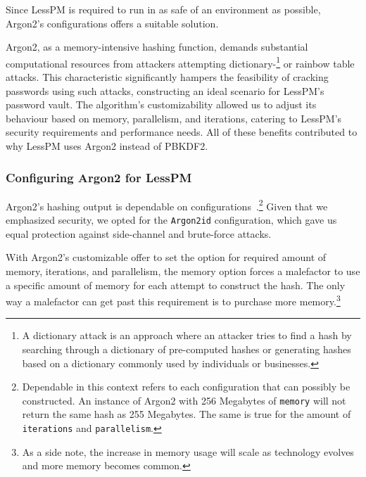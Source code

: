 
Since LessPM is required to run in as safe of an environment as possible,
Argon2's configurations offers a suitable solution.

Argon2, as a memory-intensive hashing function, demands substantial
computational resources from attackers attempting
dictionary-\footnote{
  A dictionary attack is an approach where an attacker tries to find a hash by
  searching through a dictionary of pre-computed hashes or generating hashes
  based on a dictionary commonly used by individuals or businesses.
} or rainbow table attacks.
This characteristic significantly hampers the feasibility of cracking
passwords using such attacks, constructing an ideal scenario for LessPM's
password vault.
The algorithm's customizability allowed us to adjust its behaviour
based on memory, parallelism, and iterations, catering to LessPM's security
requirements and performance needs.
All of these benefits contributed to why LessPM uses Argon2 instead of PBKDF2.

\subsubsection{Configuring Argon2 for LessPM}
Argon2's hashing output is dependable on
configurations~\cite{argon2specs}.\footnote{
  Dependable in this context refers to each configuration that can
  possibly be constructed.
  An instance of Argon2 with 256 Megabytes of \texttt{memory} will not return
  the same hash as 255 Megabytes.
  The same is true for the amount of \texttt{iterations} and
  \texttt{parallelism}.
}
Given that we emphasized security, we opted for the \texttt{Argon2id}
configuration, which gave us equal protection against side-channel and
brute-force attacks.

With Argon2's customizable offer to set the option for required amount of
memory, iterations, and parallelism, the memory option forces a malefactor to
use a specific amount of memory for each attempt to construct the hash.
The only way a malefactor can get past this requirement is to purchase more
memory.\footnote{
  As a side note, the increase in memory usage will scale as technology evolves
  and more memory becomes common.
}

